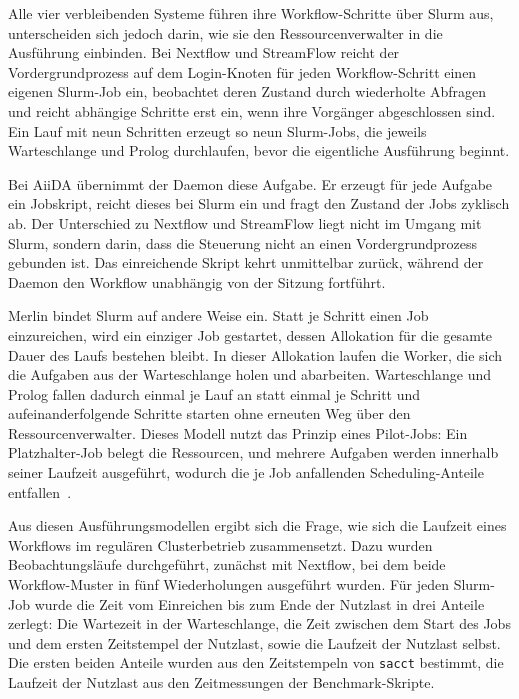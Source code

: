 Alle vier verbleibenden Systeme führen ihre Workflow-Schritte über
Slurm aus, unterscheiden sich jedoch darin, wie sie den
Ressourcenverwalter in die Ausführung einbinden. Bei Nextflow und
StreamFlow reicht der Vordergrundprozess auf dem Login-Knoten für
jeden Workflow-Schritt einen eigenen Slurm-Job ein, beobachtet deren Zustand durch wiederholte Abfragen und reicht abhängige
Schritte erst ein, wenn ihre Vorgänger abgeschlossen sind. Ein Lauf
mit neun Schritten erzeugt so neun Slurm-Jobs, die
jeweils Warteschlange und Prolog durchlaufen, bevor die eigentliche
Ausführung beginnt.

Bei AiiDA übernimmt der Daemon diese Aufgabe. Er erzeugt für jede
Aufgabe ein Jobskript, reicht dieses bei Slurm ein und fragt den
Zustand der Jobs zyklisch ab. Der Unterschied zu Nextflow und
StreamFlow liegt nicht im Umgang mit Slurm, sondern darin, dass die
Steuerung nicht an einen Vordergrundprozess gebunden ist. Das
einreichende Skript kehrt unmittelbar zurück, während der Daemon
den Workflow unabhängig von der Sitzung fortführt.

Merlin bindet Slurm auf andere Weise ein. Statt je Schritt einen
Job einzureichen, wird ein einziger Job gestartet, dessen
Allokation für die gesamte Dauer des Laufs bestehen bleibt. In dieser Allokation laufen die Worker, die sich die Aufgaben aus der Warteschlange
holen und abarbeiten. Warteschlange und Prolog fallen dadurch
einmal je Lauf an statt einmal je Schritt und aufeinanderfolgende Schritte starten ohne erneuten Weg über den
Ressourcenverwalter. Dieses Modell nutzt das Prinzip eines Pilot-Jobs: Ein Platzhalter-Job belegt die Ressourcen, und mehrere Aufgaben werden innerhalb seiner Laufzeit ausgeführt, wodurch die je Job anfallenden Scheduling-Anteile entfallen~\cite[S.~18]{chen2011overhead}.

Aus diesen Ausführungsmodellen ergibt sich die Frage, wie sich die
Laufzeit eines Workflows im regulären Clusterbetrieb
zusammensetzt. Dazu wurden Beobachtungsläufe durchgeführt, zunächst
mit Nextflow, bei dem beide Workflow-Muster in fünf Wiederholungen
ausgeführt wurden. Für jeden Slurm-Job wurde die Zeit vom
Einreichen bis zum Ende der Nutzlast in drei Anteile zerlegt: Die
Wartezeit in der Warteschlange, die Zeit zwischen dem Start des
Jobs und dem ersten Zeitstempel der Nutzlast, sowie die Laufzeit
der Nutzlast selbst. Die ersten beiden Anteile wurden aus den
Zeitstempeln von \texttt{sacct} bestimmt, die Laufzeit der Nutzlast
aus den Zeitmessungen der Benchmark-Skripte.

